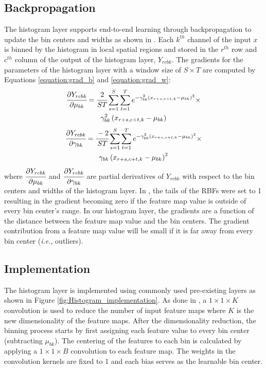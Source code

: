 \documentclass[journal]{IEEEtai}
\begin{document}
	\subsection{Backpropagation} The histogram layer supports end-to-end learning through backpropagation to update the bin centers and widths as shown in \mbox{\cite{wang2016learnable}}. Each $k^{th}$ channel of the input $x$ is binned by the histogram in local spatial regions and stored in the $r^{th}$ row and $c^{th}$ column of the output of the histogram layer, $Y_{rcbk}$. The gradients for the parameters of the histogram layer with a window size of $S \times T$ are computed by Equations \ref{equation:grad_b} and \ref{equation:grad_w}:
\begin{multline}
	\cfrac{\partial Y_{rcbk}}{\partial \mu_{bk}} = \cfrac{2}{ST} \sum_{s=1}^{S}\sum_{t=1}^{T}e^{-\gamma_{bk}^2\left(x_{r+s,c+t,k}-\mu_{bk}\right)^2} \times \\ \gamma_{bk}^2\left(x_{r+s,c+t,k}-\mu_{bk}\right)
	\label{equation:grad_b}
	\end{multline}
	\begin{multline}
\cfrac{\partial Y_{rcbk}}{\partial \gamma_{bk}} = \cfrac{-2}{ST} \sum_{s=1}^{S}\sum_{t=1}^{T}e^{-\gamma_{bk}^2\left(x_{r+s,c+t,k}-\mu_{bk}\right)^2} \times \\ \gamma_{bk}\left(x_{r+s,c+t,k}-\mu_{bk}\right)^2
	\label{equation:grad_w}
	\end{multline}
where $\cfrac{\partial Y_{rcbk}}{\partial \mu_{bk}}$ and $\cfrac{\partial Y_{rcbk}}{\partial \gamma_{bk}}$ are partial derivatives of $Y_{rcbk}$ with respect to the bin centers and widths of the histogram layer. In \cite{sedighi2017histogram}, the tails of the RBFs were set to 1 resulting in the gradient becoming zero if the feature map value is outside of every bin center's range. In our histogram layer, the gradients are a function of the distance between the feature map value and the bin centers. The gradient contribution from a feature map value will be small if it is far away from every bin center (\textit{i.e.}, outliers).
	
	\subsection{Implementation}
	The histogram layer is implemented using commonly used pre-existing layers as shown in Figure \ref{fig:Histogram_implementation}. As done in \cite{zhang2017deep,xue2018deep}, a $1 \times 1 \times K$ convolution is used to reduce the number of input feature maps where $K$ is the new dimensionality of the feature maps. After the dimensionality reduction, the binning process starts by first assigning each feature value to every bin center (subtracting $\mu_{bk}$). The centering of the features to each bin is calculated by applying a $1 \times 1 \times B$ convolution to each feature map. The weights in the convolution kernels are fixed to 1 and each bias serves as the learnable bin center. 
	
\end{document}
